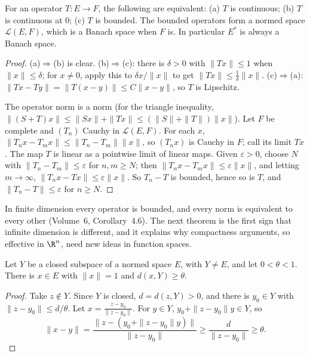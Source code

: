 \begin{proposition}\label{prop:boundedcont}
For an operator $T:E\to F$, the following are equivalent: (a) $T$ is continuous; (b) $T$ is continuous at $0$; (c) $T$ is bounded. The bounded operators form a normed space $\mathcal L(E,F)$, which is a
Banach space when $F$ is. In particular $E^*$ is always a Banach space.
\end{proposition}
\begin{proof}
(a)$\Rightarrow$(b) is clear. (b)$\Rightarrow$(c): there is $\delta>0$ with $\|Tx\|\le1$ when $\|x\|\le\delta$; for $x\ne0$, apply this to $\delta x/\|x\|$ to get $\|Tx\|\le\frac1\delta\|x\|$. (c)$\Rightarrow$(a):
$\|Tx-Ty\|=\|T(x-y)\|\le C\|x-y\|$, so $T$ is Lipschitz.

The operator norm is a norm (for the triangle inequality, $\|(S+T)x\|\le\|Sx\|+\|Tx\|\le(\|S\|+\|T\|)\|x\|$). Let $F$ be complete and $(T_n)$ Cauchy in $\mathcal L(E,F)$. For each $x$,
$\|T_nx-T_mx\|\le\|T_n-T_m\|\|x\|$, so $(T_nx)$ is Cauchy in $F$; call its limit $Tx$. The map $T$ is linear as a pointwise limit of linear maps. Given $\varepsilon>0$, choose $N$ with $\|T_n-T_m\|\le\varepsilon$ for
$n,m\ge N$; then $\|T_nx-T_mx\|\le\varepsilon\|x\|$, and letting $m\to\infty$, $\|T_nx-Tx\|\le\varepsilon\|x\|$. So $T_n-T$ is bounded, hence so is $T$, and $\|T_n-T\|\le\varepsilon$ for $n\ge N$.
\end{proof}

In finite dimension every operator is bounded, and every norm is equivalent to every other (Volume~6, Corollary~4.6). The next theorem is the first sign that infinite dimension is different, and it explains
why compactness arguments, so effective in $\R^n$, need new ideas in function spaces.

\begin{lemma}\label{lem:riesz}
Let $Y$ be a closed subspace of a normed space $E$, with $Y\ne E$, and let $0<\theta<1$. There is $x\in E$ with $\|x\|=1$ and $d(x,Y)\ge\theta$.
\end{lemma}
\begin{proof}
Take $z\notin Y$. Since $Y$ is closed, $d=d(z,Y)>0$, and there is $y_0\in Y$ with $\|z-y_0\|\le d/\theta$. Let $x=\frac{z-y_0}{\|z-y_0\|}$. For $y\in Y$, $y_0+\|z-y_0\|y\in Y$, so
\[\|x-y\|=\frac{\|z-(y_0+\|z-y_0\|y)\|}{\|z-y_0\|}\ge\frac d{\|z-y_0\|}\ge\theta.\]
\end{proof}

